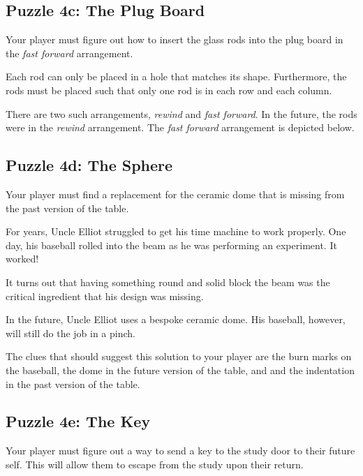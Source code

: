 \documentclass[a6paper, parskip=half, DIV=14, 12pt]{scrartcl}
\begin{document}
\newpage

\subsection*{Puzzle 4c: The Plug Board}
Your player must figure out how to insert the glass rods into the plug board in the \emph{fast forward} arrangement.

Each rod can only be placed in a hole that matches its shape.
Furthermore, the rods must be placed such that only one rod is in each row and each column.

There are two such arrangements, \emph{rewind} and \emph{fast forward}.
In the future, the rods were in the \emph{rewind} arrangement.
The \emph{fast forward} arrangement is depicted below.

\begin{center}
\end{center}

\newpage

\subsection*{Puzzle 4d: The Sphere}
Your player must find a replacement for the ceramic dome that is missing from the past version of the table.

For years, Uncle Elliot struggled to get his time machine to work properly. One day, his baseball rolled into the beam as he was performing an experiment. It worked!

It turns out that having something round and solid block the beam was the critical ingredient that his design was missing.

In the future, Uncle Elliot uses a bespoke ceramic dome. His baseball, however, will still do the job in a pinch.

The clues that should suggest this solution to your player are the burn marks on the baseball, the dome in the future version of the table, and and the indentation in the past version of the table. 
 
\newpage

\subsection*{Puzzle 4e: The Key}
Your player must figure out a way to send a key to the study door to their future self.
This will allow them to escape from the study upon their return.
\end{document}
